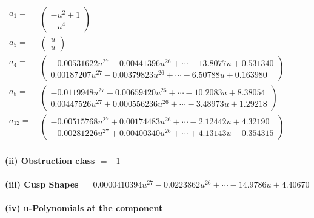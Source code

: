 \documentclass[1p]{elsarticle_modified}
\theoremstyle{definition}
\begin{document}
\begin{tabular}{m{7pt} m{180pt} m{7pt} m{180pt} }
\flushright $a_{1}=$&$\begin{pmatrix}- u^2+1\\- u^4\end{pmatrix}$ \\
\flushright $a_{5}=$&$\begin{pmatrix}u\\u\end{pmatrix}$ \\
\flushright $a_{4}=$&$\begin{pmatrix}-0.00531622 u^{27}-0.00441396 u^{26}+\cdots-13.8077 u+0.531340\\0.00187207 u^{27}-0.00379823 u^{26}+\cdots-6.50788 u+0.163980\end{pmatrix}$ \\
\flushright $a_{8}=$&$\begin{pmatrix}-0.0119948 u^{27}-0.00659420 u^{26}+\cdots-10.2083 u+8.38054\\0.00447526 u^{27}+0.000556236 u^{26}+\cdots-3.48973 u+1.29218\end{pmatrix}$ \\
\flushright $a_{12}=$&$\begin{pmatrix}-0.00515768 u^{27}+0.00174483 u^{26}+\cdots-2.12442 u+4.32190\\-0.00281226 u^{27}+0.00400340 u^{26}+\cdots+4.13143 u-0.354315\end{pmatrix}$\\&\end{tabular}
\flushleft \textbf{(ii) Obstruction class $= -1$}\\~\\
\flushleft \textbf{(iii) Cusp Shapes $= 0.0000410394 u^{27}-0.0223862 u^{26}+\cdots-14.9786 u+4.40670$}\\~\\
\newpage\renewcommand{\arraystretch}{1}
\flushleft \textbf{(iv) u-Polynomials at the component}\newline \\
\end{document}
